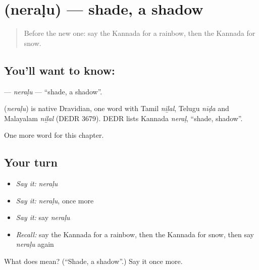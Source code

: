 \section[\texorpdfstring{\kn{ನೆರಳು} (neraḷu)}{ನೆರಳು (neraḷu)}]{ (neraḷu) — shade, a shadow}

\label{lesson:KA-C187-neralu}



\begin{quote}
Before the new one: say the Kannada for a rainbow, then the Kannada for snow.
\end{quote}

\subsection*{You'll want to know: }
\textbf{} — \emph{neraḷu} — \textquotedblleft{}shade, a shadow\textquotedblright{}.

\begin{cousinweb}
\textbf{} (\emph{neraḷu}) is native Dravidian, one word with Tamil \emph{niḻal}, Telugu \emph{nīḍa} and Malayalam \emph{niḻal} (DEDR 3679). DEDR lists Kannada \emph{neraḷ}, \textquotedblleft{}shade, shadow\textquotedblright{}.
\end{cousinweb}

\begin{grammarlens}[title={What you've built}]
One more word for this chapter.
\end{grammarlens}

\subsection*{Your turn}
\begin{itemize}
\raggedright
  \item \emph{Say it:} \emph{neraḷu}
  \item \emph{Say it:} \emph{neraḷu}, once more
  \item \emph{Say it:} say \emph{neraḷu}
  \item \emph{Recall:} say the Kannada for a rainbow, then the Kannada for snow, then say \emph{neraḷu} again
\end{itemize}

\begin{tcolorbox}[breakable,colback=teal!4,colframe=teal!35!black,title={Before you move on}]
What does  mean? (\textquotedblleft{}Shade, a shadow\textquotedblright{}.) Say it once more.
\end{tcolorbox}
